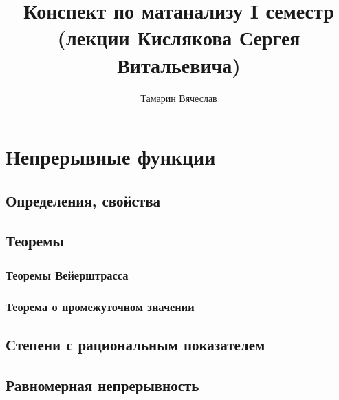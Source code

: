 \documentclass[11pt]{book}
\title{Конспект по матанализу I семестр\\ (лекции Кислякова Сергея Витальевича)}
\author{Тамарин Вячеслав}
\begin{document}
\pagestyle{fancy}

\renewcommand{\proofname}{Proof}

\theoremstyle{plain}
\newtheorem{thm}{Theorem}[section]
\newtheorem*{aks}{Аксиома}[section]
\newtheorem*{lm}{Lemma}
\newtheorem*{st}{Statement}
\newtheorem*{prop}{Property}

\theoremstyle{definition}
\newtheorem{defn}{Def}
\newtheorem*{ex}{Example}
\newtheorem*{exs}{Examples}
\newtheorem*{cor}{Corollary}
\newtheorem*{name}{Designation}

\theoremstyle{remark}
\newtheorem*{rem}{Remain}
\newtheorem*{note}{Note}
\newtheorem*{probl}{Exercise}
\newtheorem*{prac}{Practice}

\newcommand{\Z}{\mathbb{Z}}
\newcommand{\N}{\mathbb{N}}
\newcommand{\R}{\mathbb{R}}
\newcommand{\Q}{\mathbb{Q}}
\newcommand{\K}{\mathbb{K}}
\newcommand{\Cm}{\mathbb{C}}
\newcommand{\Pm}{\mathbb{P}}
\newcommand{\ilim}{\int\limits}
\newcommand{\slim}{\sum\limits}
\newcommand{\pivi}{\stackrel \circ }

\maketitle
\clearpage
\tableofcontents
\clearpage

\chapter{Непрерывные функции}
\section{Определения, свойства}
\section{Теоремы}
\subsection{Теоремы Вейерштрасса}
\subsection{Теорема о промежуточном значении}
\section{Степени с рациональным показателем}
\section{Равномерная непрерывность}
\end{document}
